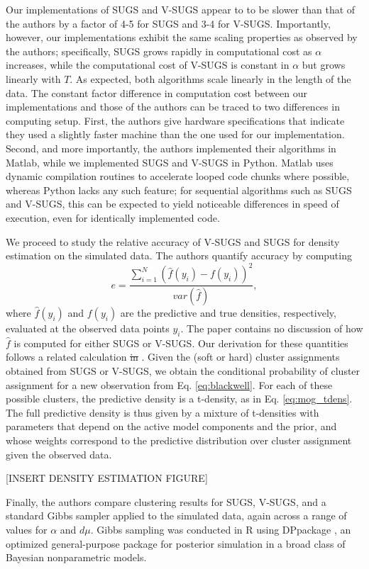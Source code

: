 \documentclass{uwstat572}
\newcommand{\vmdel}[1]{\sout{#1}}
\newcommand{\vmadd}[1]{\textbf{\color{red}{#1}}}
\begin{document}
Our implementations of SUGS and V-SUGS appear to to be slower than that of the authors by a factor of 4-5 for SUGS and 3-4 for V-SUGS. Importantly, however, our implementations exhibit the same scaling properties as observed by the authors; specifically, SUGS grows rapidly in computational cost as $\alpha$ increases, while the computational cost of V-SUGS is constant in $\alpha$ but grows linearly with $T$. As expected, both algorithms scale linearly in the length of the data. The constant factor difference in computation cost between our implementations and those of the authors can be traced to two differences in computing setup. First, the authors give hardware specifications that indicate they used a slightly faster machine than the one used for our implementation. Second, and more importantly, the authors implemented their algorithms in Matlab, while we implemented SUGS and V-SUGS in Python. Matlab uses dynamic compilation routines to accelerate looped code chunks where possible, whereas Python lacks any such feature; for sequential algorithms such as SUGS and V-SUGS, this can be expected to yield noticeable differences in speed of execution, even for identically implemented code. 

We proceed to study the relative accuracy of V-SUGS and SUGS for density estimation on the simulated data. The authors quantify accuracy by computing 
$$ e = \frac{\sum_{i=1}^N (\hat{f}(y_i)-f(y_i))^2}{var(\hat{f})},$$
where $\hat{f}(y_i)$ and $f(y_i)$ are the predictive and true densities, respectively, evaluated at the observed data points $y_i$. The paper contains no discussion of how $\hat{f}$ is computed for either SUGS or V-SUGS. Our derivation for these quantities follows a related calculation \vmdel{in} \vmadd{by} \cite{west}. Given the (soft or hard) cluster assignments obtained from SUGS or V-SUGS, we obtain the conditional probability of cluster assignment for a new observation from Eq. \eqref{eq:blackwell}. For each of these possible clusters, the predictive density is a t-density, as in Eq. \eqref{eq:mog_tdens}. The full predictive density is thus given by a mixture of t-densities with parameters that depend on the active model components and the prior, and whose weights correspond to the predictive distribution over cluster assignment given the observed data. 

[INSERT DENSITY ESTIMATION FIGURE]

Finally, the authors compare clustering results for SUGS, V-SUGS, and a standard Gibbs sampler applied to the simulated data, again across a range of values for $\alpha$ and $d\mu$. Gibbs sampling was conducted in R using DPpackage \citep{jara}, an optimized general-purpose package for posterior simulation in a broad class of Bayesian nonparametric models.
\end{document}
